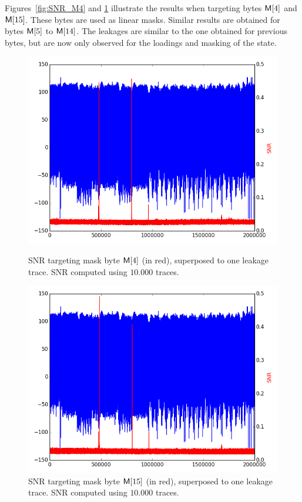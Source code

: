 Figures~\ref{fig:SNR_M4} and \ref{fig:SNR_M15} illustrate the results when targeting bytes $\mathsf{M}[4]$ and $\mathsf{M}[15]$. These bytes are used as linear masks. Similar results are obtained for bytes $\mathsf{M}[5]$ to $\mathsf{M}[14]$.
The leakages are similar to the one obtained for previous bytes, but are now only observed for the loadings and masking of the state.
\begin{figure}[H]
	\centering 
	\includegraphics[scale=0.35]{figures/2Mpts/SNR_M4_10ktraces.png}
	\caption{SNR targeting mask byte $\mathsf{M}[4]$ (in red), superposed to one leakage trace. SNR computed using $10.000$ traces.}
	\label{fig:SNR_M4}
	\includegraphics[scale=0.35]{figures/2Mpts/SNR_M15_10ktraces.png}
	\caption{SNR targeting mask byte $\mathsf{M}[15]$ (in red), superposed to one leakage trace. SNR computed using $10.000$ traces.}
	\label{fig:SNR_M15}
\end{figure}

